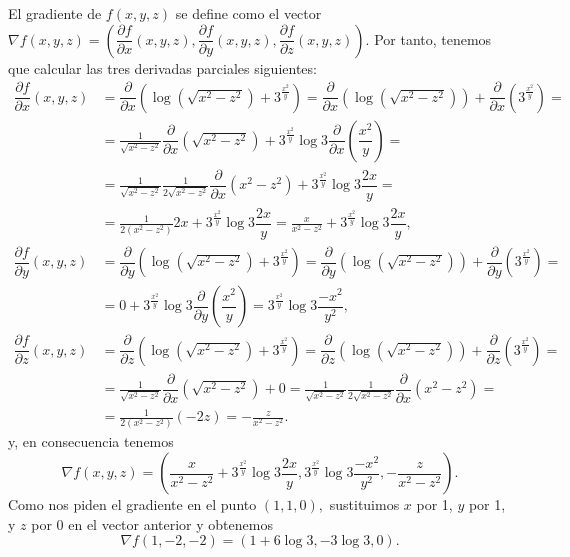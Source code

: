 {El gradiente de $f(x,y,z)$ se define como el vector $\nabla f(x,y,z)=(\dfrac{\partial f}{\partial x}(x,y,z),\dfrac{\partial f}{\partial y}(x,y,z),\dfrac{\partial f}{\partial z}(x,y,z))$. Por tanto, tenemos que calcular las tres derivadas parciales siguientes:
\begin{align*}
\dfrac{\partial f}{\partial x}(x,y,z) &= \dfrac{\partial }{\partial x}(\log\left(\sqrt{x^{2}-z^{2}}\right) +3^{\tfrac{x^{2}}{y}}) = \dfrac{\partial }{\partial x}(\log \left(\sqrt{x^{2}-z^{2}}\right) )+\dfrac{\partial }{\partial x}(3^{\tfrac{x^{2}}{y}})= \\
&= \frac{1}{\sqrt{x^{2}-z^{2}}}\dfrac{\partial }{\partial x}(\sqrt{x^{2}-z^{2}})+3^{\tfrac{x^{2}}{y}}\log 3\dfrac{\partial }{\partial x}(\dfrac{x^{2}}{y}) = \\
&= \frac{1}{\sqrt{x^{2}-z^{2}}}\frac{1}{2\sqrt{x^{2}-z^{2}}}\dfrac{\partial}{\partial x}(x^{2}-z^{2})+3^{\tfrac{x^{2}}{y}}\log 3\dfrac{2x}{y}= \\
&= \frac{1}{2(x^{2}-z^{2})}2x+3^{\tfrac{x^{2}}{y}}\log 3\dfrac{2x}{y}=\frac{x}{x^{2}-z^{2}}+3^{\tfrac{x^{2}}{y}}\log 3\dfrac{2x}{y}, \\
\dfrac{\partial f}{\partial y}(x,y,z) &= \dfrac{\partial }{\partial y}(\log\left( \sqrt{x^{2}-z^{2}}\right) +3^{\tfrac{x^{2}}{y}}) = \dfrac{\partial }{\partial y}(\log \left( \sqrt{x^{2}-z^{2}}\right) )+\dfrac{\partial }{\partial y}(3^{\tfrac{x^{2}}{y}})= \\
&= 0+3^{\tfrac{x^{2}}{y}}\log 3\dfrac{\partial }{\partial y}(\dfrac{x^{2}}{y}) = 3^{\tfrac{x^{2}}{y}}\log 3\dfrac{-x^{2}}{y^{2}}, \\
\dfrac{\partial f}{\partial z}(x,y,z) &= \dfrac{\partial }{\partial z}(\log\left( \sqrt{x^{2}-z^{2}}\right) +3^{\tfrac{x^{2}}{y}}) = \dfrac{\partial }{\partial z}(\log \left( \sqrt{x^{2}-z^{2}}\right) )+\dfrac{\partial }{\partial z}(3^{\tfrac{x^{2}}{y}})= \\
&= \frac{1}{\sqrt{x^{2}-z^{2}}}\dfrac{\partial }{\partial x}(\sqrt{x^{2}-z^{2}})+0 = \frac{1}{\sqrt{x^{2}-z^{2}}}\frac{1}{2\sqrt{x^{2}-z^{2}}}\dfrac{\partial }{\partial x}(x^{2}-z^{2})= \\
&= \frac{1}{2(x^{2}-z^{2})}(-2z)=-\frac{z}{x^{2}-z^{2}}.
\end{align*}
y, en consecuencia tenemos
\[
\nabla f(x,y,z)=(\frac{x}{x^{2}-z^{2}}+3^{\tfrac{x^{2}}{y}}\log 3\dfrac{2x}{y},3^{\tfrac{x^{2}}{y}}\log 3\dfrac{-x^{2}}{y^{2}},-\frac{z}{x^{2}-z^{2}}).
\]
Como nos piden el gradiente en el punto $(1,1,0),$ sustituimos $x$ por 1, $y$
por 1, y $z$ por 0 en el vector anterior y obtenemos
\[
\nabla f(1,-2,-2)=(1+6\log 3,-3\log 3,0).
\]
}


